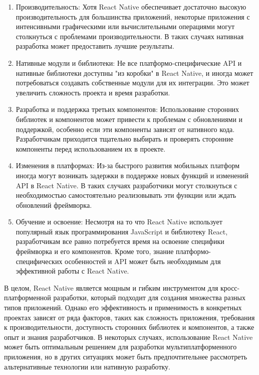 \documentclass[14pt, russian]{scrartcl}
\begin{document}
\begin{enumerate}
    \item Производительность: Хотя React Native обеспечивает достаточно высокую производительность для большинства приложений, некоторые приложения с интенсивными графическими или вычислительными операциями могут столкнуться с проблемами производительности. В таких случаях нативная разработка может предоставить лучшие результаты. ~\cite{Performance}
    \item Нативные модули и библиотеки: Не все платформо-специфические API и нативные библиотеки доступны "из коробки" в React Native, и иногда может потребоваться создавать собственные модули для их интеграции. Это может увеличить сложность проекта и время разработки.
    \item Разработка и поддержка третьих компонентов: Использование сторонних библиотек и компонентов может привести к проблемам с обновлениями и поддержкой, особенно если эти компоненты зависят от нативного кода. Разработчикам приходится тщательно выбирать и проверять сторонние компоненты перед использованием их в проекте.
    \item Изменения в платформах: Из-за быстрого развития мобильных платформ иногда могут возникать задержки в поддержке новых функций и изменений API в React Native. В таких случаях разработчики могут столкнуться с необходимостью самостоятельно реализовывать эти функции или ждать обновлений фреймворка.
    \item Обучение и освоение: Несмотря на то что React Native использует популярный язык программирования JavaScript и библиотеку React, разработчикам все равно потребуется время на освоение специфики фреймворка и его компонентов. Кроме того, знание платформо-специфических особенностей и API может быть необходимым для эффективной работы с React Native.
\end{enumerate}

В целом, React Native является мощным и гибким инструментом для кросс-платформенной разработки, который подходит для создания множества разных типов приложений. Однако его эффективность и применимость в конкретных проектах зависят от ряда факторов, таких как сложность приложения, требования к производительности, доступность сторонних библиотек и компонентов, а также опыт и знания разработчиков. В некоторых случаях, использование React Native может быть оптимальным решением для разработки мультиплатформенного приложения, но в других ситуациях может быть предпочтительнее рассмотреть альтернативные технологии или нативную разработку.
\end{document}

